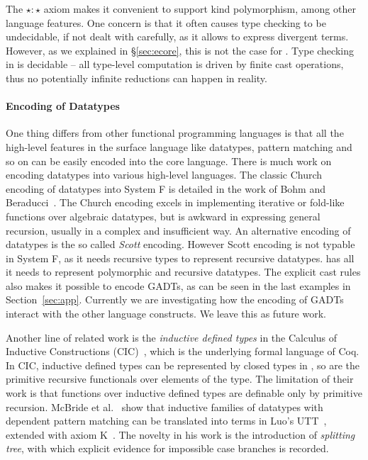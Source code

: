 The $\star : \star$ axiom makes it convenient to support kind
polymorphism, among other language features. One concern is that it
often causes type checking to be undecidable, if not dealt with
carefully, as it allows to express divergent terms. However, as we
explained in \S\ref{sec:ecore}, this is not the case for \name. Type
checking in \name is decidable -- all type-level computation is driven
by finite cast operations, thus no potentially infinite reductions can
happen in reality.

\paragraph{Encoding of Datatypes}
One thing \name differs from other functional programming languages is
that all the high-level features in the surface language like
datatypes, pattern matching and so on can be easily encoded into the
core language. There is much work on encoding datatypes into various
high-level languages. The classic Church encoding of datatypes into
System F is detailed in the work of Bohm and
Beraducci~\cite{Bohm1985}. The Church encoding excels in implementing
iterative or fold-like functions over algebraic datatypes, but is
awkward in expressing general recursion, usually in a complex and
insufficient way. An alternative encoding of datatypes is the so
called \emph{Scott} encoding. However Scott encoding is not typable in
System F, as it needs recursive types to represent recursive
datatypes. \name has all it needs to represent polymorphic and
recursive datatypes. The explicit cast rules also makes it possible to
encode GADTs, as can be seen in the last examples in
Section~\ref{sec:app}. Currently we are investigating how the encoding
of GADTs interact with the other language constructs. We leave this as
future work.

Another line of related work is the \emph{inductive defined types} in
the Calculus of Inductive Constructions (CIC)~\cite{cic}, which is the
underlying formal language of Coq. In CIC, inductive defined types can
be represented by closed types in \coc, so are the primitive recursive
functionals over elements of the type. The limitation of their work is
that functions over inductive defined types are definable only by
primitive recursion. McBride et al.~\cite{elim:pi:pattern} show that
inductive families of datatypes with dependent pattern matching can be
translated into terms in Luo's UTT~\cite{Luo:UTT}, extended with axiom
K~\cite{axiomK}. The novelty in his work is the introduction of
\emph{splitting tree}, with which explicit evidence for impossible
case branches is recorded.

